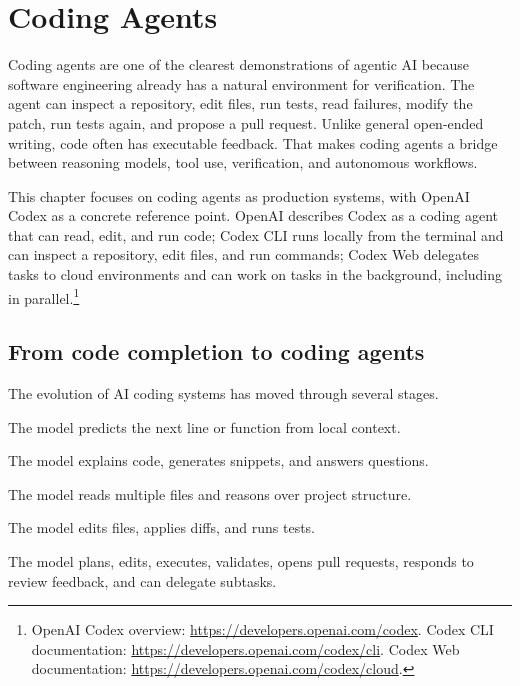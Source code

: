 \chapter{Coding Agents}

Coding agents are one of the clearest demonstrations of agentic AI because software engineering already has a natural environment for verification. The agent can inspect a repository, edit files, run tests, read failures, modify the patch, run tests again, and propose a pull request. Unlike general open-ended writing, code often has executable feedback. That makes coding agents a bridge between reasoning models, tool use, verification, and autonomous workflows.

This chapter focuses on coding agents as production systems, with OpenAI Codex as a concrete reference point. OpenAI describes Codex as a coding agent that can read, edit, and run code; Codex CLI runs locally from the terminal and can inspect a repository, edit files, and run commands; Codex Web delegates tasks to cloud environments and can work on tasks in the background, including in parallel.\footnote{OpenAI Codex overview: \url{https://developers.openai.com/codex}. Codex CLI documentation: \url{https://developers.openai.com/codex/cli}. Codex Web documentation: \url{https://developers.openai.com/codex/cloud}.}

\section{From code completion to coding agents}

The evolution of AI coding systems has moved through several stages.

\begin{description}[leftmargin=*]
  \item[Autocomplete.] The model predicts the next line or function from local context.
  \item[Chat assistant.] The model explains code, generates snippets, and answers questions.
  \item[Repository assistant.] The model reads multiple files and reasons over project structure.
  \item[Patch agent.] The model edits files, applies diffs, and runs tests.
  \item[Software engineering agent.] The model plans, edits, executes, validates, opens pull requests, responds to review feedback, and can delegate subtasks.
\end{description}

